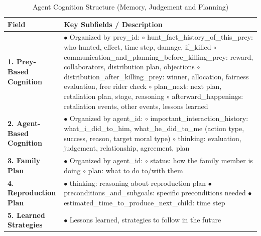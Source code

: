 \begin{table}[htbp]
    \centering
    \caption{Agent Cognition Structure (Memory, Judgement and Planning)}
    \label{tab:agent_cognition}
    \small
    \setlength{\tabcolsep}{4pt}
    \begin{tabular}{p{4cm}p{9cm}}
    \toprule
    \textbf{Field} & \textbf{Key Subfields / Description} \\
    \midrule
    \textbf{1. Prey-Based Cognition} &
    $\bullet$ Organized by prey\_id: \newline
    \hspace*{1em} $\circ$ hunt\_fact\_history\_of\_this\_prey: who hunted, effect, time step, damage, if\_killed \newline
    \hspace*{1em} $\circ$ communication\_and\_planning\_before\_killing\_prey: reward, collaborators, distribution plan, objections \newline
    \hspace*{1em} $\circ$ distribution\_after\_killing\_prey: winner, allocation, fairness evaluation, free rider check \newline
    \hspace*{1em} $\circ$ plan\_next: next plan, retaliation plan, stage, reasoning \newline
    \hspace*{1em} $\circ$ afterward\_happenings: retaliation events, other events, lessons learned \\
    \midrule
    \textbf{2. Agent-Based Cognition} &
    $\bullet$ Organized by agent\_id: \newline
    \hspace*{1em} $\circ$ important\_interaction\_history: what\_i\_did\_to\_him, what\_he\_did\_to\_me (action type, success, reason, target moral type) \newline
    \hspace*{1em} $\circ$ thinking: evaluation, judgement, relationship, agreement, plan \\
    \midrule
    \textbf{3. Family Plan} &
    $\bullet$ Organized by agent\_id: \newline
    \hspace*{1em} $\circ$ status: how the family member is doing \newline
    \hspace*{1em} $\circ$ plan: what to do to/with them \\
    \midrule
    \textbf{4. Reproduction Plan} &
    $\bullet$ thinking: reasoning about reproduction plan \newline
    $\bullet$ preconditions\_and\_subgoals: specific preconditions needed \newline
    $\bullet$ estimated\_time\_to\_produce\_next\_child: time step \\
    \midrule
    \textbf{5. Learned Strategies} &
    $\bullet$ Lessons learned, strategies to follow in the future \\
    \bottomrule
    \end{tabular}
\end{table}


